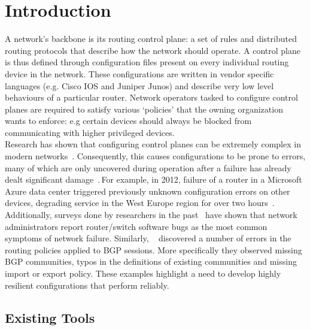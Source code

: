 \section{Introduction}

A network's backbone is its routing control plane: a set of rules and distributed routing protocols that describe how the network should operate. A control plane is thus defined through configuration files present on every individual routing device in the network. These configurations are written in vendor specific languages (e.g. Cisco IOS and Juniper Junos) and describe very low level behaviours of a particular router. Network operators tasked to configure control planes are required to satisfy various `policies' that the owning organization wants to enforce: e.g certain devices should always be blocked from communicating with higher privileged devices.\\

Research has shown that configuring control planes can be extremely complex in modern networks~\cite{complexity}. Consequently, this causes configurations to be prone to errors, many of which are only uncovered during operation after a failure has already dealt significant damage~\cite{errors}. For example, in 2012, failure of a router in a Microsoft Azure data center triggered previously unknown configuration errors on other devices, degrading service in the West Europe region for over two hours~\cite{azure}. Additionally, surveys done by researchers in the past~\cite{Zeng} have shown that network administrators report router/switch software bugs as the most common symptoms of network failure. Similarly, ~\cite{Lee} discovered a number of errors in the routing policies applied to BGP sessions. More specifically they observed missing BGP communities, typos in the definitions of existing communities and missing import or export policy. These examples highlight a need to develop highly resilient configurations that perform reliably.\\  


\subsection{Existing Tools}

